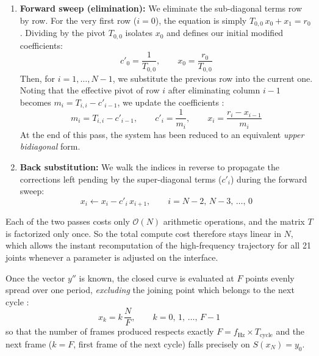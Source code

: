 \documentclass{tropLaClasse}
\begin{document}
\begin{enumerate}
    \item \textbf{Forward sweep (elimination):} We eliminate the sub-diagonal terms row by row. For the very first row ($i=0$), the equation is simply $T_{0,0}\, x_0 + x_1 = r_0$. Dividing by the pivot $T_{0,0}$ isolates $x_0$ and defines our initial modified coefficients:
    \begin{equation}
        c'_0 = \frac{1}{T_{0,0}}, \qquad x_0 = \frac{r_0}{T_{0,0}}
    \end{equation}
    Then, for $i = 1, \dots, N-1$, we substitute the previous row into the current one. Noting that the effective pivot of row $i$ after eliminating column $i-1$ becomes $m_i = T_{i,i} - c'_{i-1}$, we update the coefficients :
    \begin{equation}
        m_i = T_{i,i} - c'_{i-1}, \qquad
        c'_i = \frac{1}{m_i}, \qquad
        x_i = \frac{r_i - x_{i-1}}{m_i}
        \label{eq:thomas-forward}
    \end{equation}
    At the end of this pass, the system has been reduced to an equivalent \emph{upper bidiagonal} form.
    
    \item \textbf{Back substitution:} We walk the indices in reverse to propagate the corrections left pending by the super-diagonal terms ($c'_i$) during the forward sweep:
    \begin{equation}
        x_i \leftarrow x_i - c'_i\, x_{i+1}, \qquad i = N-2,\, N-3,\, \dots,\, 0
        \label{eq:thomas-backward}
    \end{equation}
\end{enumerate}

Each of the two passes costs only $\mathcal{O}(N)$ arithmetic operations, and the matrix $T$ is factorized only once. So the total compute cost therefore stays linear in $N$, which allows the instant recomputation of the high-frequency trajectory for all 21 joints whenever a parameter is adjusted on the interface.

Once the vector $y''$ is known, the closed curve is evaluated at $F$ points evenly spread over one period, \emph{excluding} the joining point which belongs to the next cycle :
\begin{equation}
    x_k = k\,\frac{N}{F}, \qquad k = 0,\, 1,\, \dots,\, F-1
\end{equation}
so that the number of frames produced respects exactly $F = f_{\mathrm{Hz}} \times T_{\mathrm{cycle}}$ and the next frame ($k = F$, first frame of the next cycle) falls precisely on $S(x_N) = y_0$.
\end{document}
